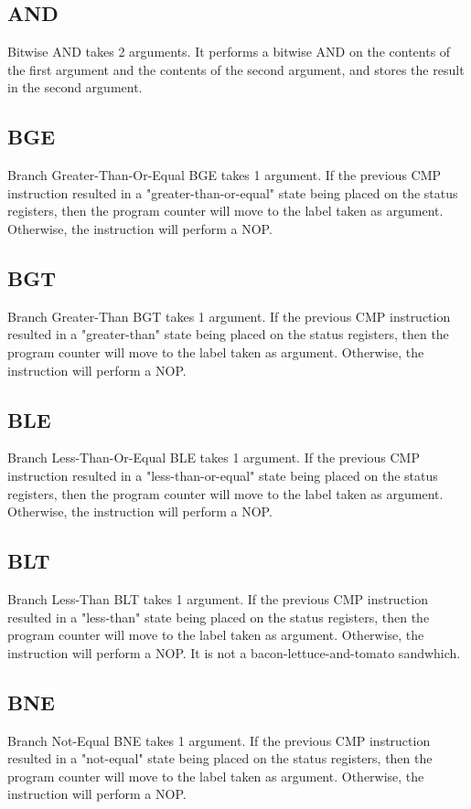 \documentclass[10pt,fullpage]{article}
\begin{document}
\subsection*{AND}
Bitwise AND takes 2 arguments. It performs a bitwise AND on the
contents of the first argument and the contents of the second
argument, and stores the result in the second argument.

\subsection*{BGE}
Branch Greater-Than-Or-Equal BGE takes 1 argument. If the previous
CMP instruction resulted in a "greater-than-or-equal" state being
placed on the status registers, then the program counter will move
to the label taken as argument. Otherwise, the instruction will
perform a NOP.

\subsection*{BGT}
Branch Greater-Than BGT takes 1 argument. If the previous CMP
instruction resulted in a "greater-than" state being placed on the
status registers, then the program counter will move to the label
taken as argument. Otherwise, the instruction will perform a NOP.

\subsection*{BLE}
Branch Less-Than-Or-Equal BLE takes 1 argument. If the previous CMP
instruction resulted in a "less-than-or-equal" state being placed on
the status registers, then the program counter will move to the
label taken as argument. Otherwise, the instruction will perform a
NOP.

\subsection*{BLT}
Branch Less-Than BLT takes 1 argument. If the previous CMP
instruction resulted in a "less-than" state being placed on the
status registers, then the program counter will move to the label
taken as argument. Otherwise, the instruction will perform a NOP. It
is not a bacon-lettuce-and-tomato sandwhich.

\subsection*{BNE}
Branch Not-Equal BNE takes 1 argument. If the previous CMP
instruction resulted in a "not-equal" state being placed on the
status registers, then the program counter will move to the label
taken as argument. Otherwise, the instruction will perform a NOP.
\end{document}
